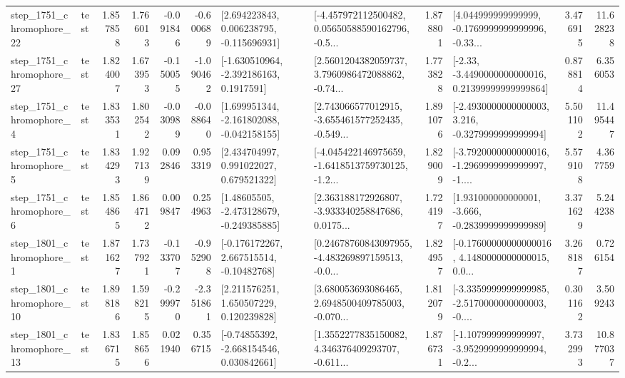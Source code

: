 \begin{tabular}{llrrrrllrlrr}
 step\_1751\_chromophore\_22 &      test &      1.857858 &    1.766013 &     -0.091846 & -0.600689 &    [2.694223843, 0.006238795, -0.115696931] &  [-4.457972112500482, 0.05650588590162796, -0.5... &       1.878801 &  [4.044999999999999, -0.1769999999999996, -0.33... &            3.476915 &         11.628238 \\
 step\_1751\_chromophore\_27 &      test &      1.824007 &    1.673953 &     -0.150055 & -1.090462 &     [-1.630510964, -2.392186163, 0.1917591] &  [2.5601204382059737, 3.7960986472088862, -0.74... &       1.773828 &  [-2.33, -3.4490000000000016, 0.21399999999999864] &            0.878814 &          6.356053 \\
  step\_1751\_chromophore\_4 &      test &      1.833531 &    1.802542 &     -0.030989 & -0.088640 &   [1.699951344, -2.161802088, -0.042158155] &  [2.743066577012915, -3.655461577252435, -0.549... &       1.891076 &  [-2.4930000000000003, 3.216, -0.3279999999999994] &            5.501102 &         11.495447 \\
  step\_1751\_chromophore\_5 &      test &      1.834293 &    1.927139 &      0.092846 &  0.953319 &     [2.434704997, 0.991022027, 0.679521322] &  [-4.045422146975659, -1.6418513759730125, -1.2... &       1.829009 &  [-3.7920000000000016, -1.2969999999999997, -1.... &            5.579108 &          4.367759 \\
  step\_1751\_chromophore\_6 &      test &      1.854865 &    1.864712 &      0.009847 &  0.254963 &    [1.48605505, -2.473128679, -0.249385885] &  [2.363188172926807, -3.933340258847686, 0.0175... &       1.724197 &   [1.931000000000001, -3.666, -0.2839999999999989] &            3.371629 &          5.244238 \\
  step\_1801\_chromophore\_1 &      test &      1.871627 &    1.737921 &     -0.133707 & -0.952908 &    [-0.176172267, 2.667515514, -0.10482768] &  [0.24678760843097955, -4.483269897159513, -0.0... &       1.824957 &  [-0.17600000000000016, 4.1480000000000015, 0.0... &            3.268187 &          0.726154 \\
 step\_1801\_chromophore\_10 &      test &      1.898186 &    1.598215 &     -0.299970 & -2.351861 &     [2.211576251, 1.650507229, 0.120239828] &  [3.680053693086465, 2.6948500409785003, -0.070... &       1.812079 &  [-3.3359999999999985, -2.5170000000000003, -0.... &            0.301162 &          3.509243 \\
 step\_1801\_chromophore\_13 &      test &      1.836715 &    1.858656 &      0.021940 &  0.356715 &    [-0.74855392, -2.668154546, 0.030842661] &  [1.3552277835150082, 4.346376409293707, -0.611... &       1.876731 &  [-1.107999999999997, -3.9529999999999994, -0.2... &            3.732993 &         10.877037 \\

\end{tabular}
